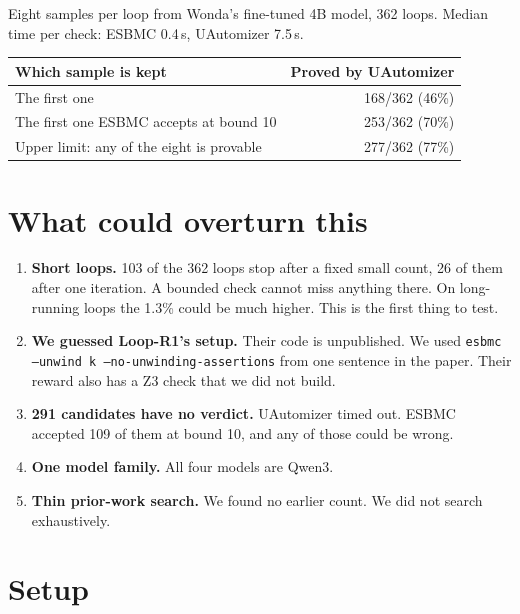 \documentclass[11pt]{article}
\newcommand{\code}[1]{\texttt{#1}}
\begin{document}
Eight samples per loop from Wonda's fine-tuned 4B model, 362 loops. Median time per check:
ESBMC 0.4\,s, UAutomizer 7.5\,s.

\begin{center}
\begin{tabular}{lr}
\toprule
Which sample is kept & Proved by UAutomizer \\
\midrule
The first one & 168/362 (46\%) \\
The first one ESBMC accepts at bound 10 & 253/362 (70\%) \\
Upper limit: any of the eight is provable & 277/362 (77\%) \\
\bottomrule
\end{tabular}
\end{center}

\section{What could overturn this}

\begin{enumerate}
\item \textbf{Short loops.} 103 of the 362 loops stop after a fixed small count, 26 of them
after one iteration. A bounded check cannot miss anything there. On long-running loops the
1.3\% could be much higher. This is the first thing to test.
\item \textbf{We guessed Loop-R1's setup.} Their code is unpublished. We used
\code{esbmc --unwind k --no-unwinding-assertions} from one sentence in the paper. Their reward
also has a Z3 check that we did not build.
\item \textbf{291 candidates have no verdict.} UAutomizer timed out. ESBMC accepted 109 of them
at bound 10, and any of those could be wrong.
\item \textbf{One model family.} All four models are Qwen3.
\item \textbf{Thin prior-work search.} We found no earlier count. We did not search exhaustively.
\end{enumerate}

\section{Setup}
\end{document}
